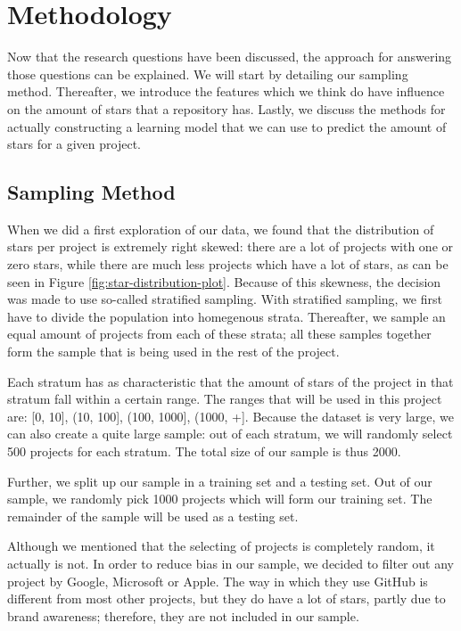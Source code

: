 \section{Methodology}
    Now that the research questions have been discussed, the approach for answering those questions can be explained.
    We will start by detailing our sampling method. 
    Thereafter, we introduce the features which we think do have influence on the amount of stars that a repository has.
    Lastly, we discuss the methods for actually constructing a learning model that we can use to predict the amount of stars for a given project.
    \subsection{Sampling Method}
        When we did a first exploration of our data, we found that the distribution of stars per project is extremely right skewed: there are a lot of projects with one or zero stars, while there are much less projects which have a lot of stars, as can be seen in Figure \ref{fig:star-distribution-plot}.
        Because of this skewness, the decision was made to use so-called stratified sampling.
        With stratified sampling, we first have to divide the population into homegenous strata. 
        Thereafter, we sample an equal amount of projects from each of these strata; 
        all these samples together form the sample that is being used in the rest of the project.
        
        Each stratum has as characteristic that the amount of stars of the project in that stratum fall within a certain range. 
        The ranges that will be used in this project are: [0, 10], (10, 100], (100, 1000], (1000, +].
        Because the dataset is very large, we can also create a quite large sample:         
        out of each stratum, we will randomly select 500 projects for each stratum. The total size of our sample is thus 2000.
        
        Further, we split up our sample in a training set and a testing set. Out of our sample, we randomly pick 1000 projects which will form our training set. The remainder of the sample will be used as a testing set.
        
        Although we mentioned that the selecting of projects is completely random, it actually is not. In order to reduce bias in our sample, we decided to filter out any project by Google, Microsoft or Apple.
        The way in which they use GitHub is different from most other projects, but they do have a lot of stars, partly due to brand awareness; therefore, they are not included in our sample.
        
